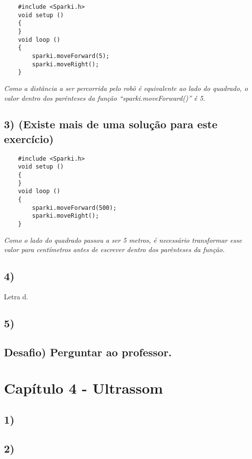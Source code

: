     \begin{verbatim}
    #include <Sparki.h>
    void setup ()
    {
    }
    void loop ()
    {
        sparki.moveForward(5);
        sparki.moveRight();
    }
    \end{verbatim}
    
    \textsl{Como a distância a ser percorrida pelo robô é equivalente ao lado do quadrado, o valor dentro dos parênteses da função ``sparki.moveForward()'' é 5.}
    
    \subsection*{3) (Existe mais de uma solução para este exercício)} 
    
    \begin{verbatim}
    #include <Sparki.h>
    void setup ()
    {
    }
    void loop ()
    {
        sparki.moveForward(500);
        sparki.moveRight();
    }
    \end{verbatim}
    
    \textsl{Como o lado do quadrado passou a ser 5 metros, é necessário transformar esse valor para centímetros antes de escrever dentro dos parênteses da função.}
    
    \subsection*{4)}
    Letra d.
    
    \subsection*{5)}
    
    \subsection*{Desafio) Perguntar ao professor.}
    
\section*{Capítulo 4 - Ultrassom}

    \subsection*{1)}
    
    \subsection*{2)}
    
